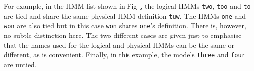 

For example, in the HMM list shown in Fig~\href{f:hlisteg},
the logical HMMs {\tt two}, {\tt too} and {\tt to} are tied
and share the same physical HMM definition {\tt tuw}.  The HMMs {\tt one}
and {\tt won} are also tied but in this case {\tt won} shares {\tt one}'s
definition.  There is, however, no subtle distinction here. The two different
cases are given just to emphasise that the names used for the logical and physical
HMMs can be the same or different, as is convenient.  Finally, in this example,
the models {\tt three} and {\tt four} are untied.


